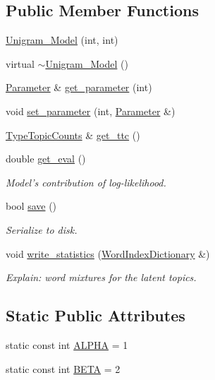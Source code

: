 \subsection*{Public Member Functions}
\begin{DoxyCompactItemize}
\item 
\hyperlink{class_unigram___model_aa86fe0d209d879da85845ac965b81114}{Unigram\_\-Model} (int, int)
\item 
virtual \hyperlink{class_unigram___model_ad586c2960ea07499611ca3c35050d8d3}{$\sim$Unigram\_\-Model} ()
\item 
\hyperlink{struct_parameter}{Parameter} \& \hyperlink{class_unigram___model_a4019fec4ad9201ff501e9649c7d56dac}{get\_\-parameter} (int)
\item 
void \hyperlink{class_unigram___model_a6c75eb8c6c27305b9d37f2425c471c34}{set\_\-parameter} (int, \hyperlink{struct_parameter}{Parameter} \&)
\item 
\hyperlink{class_type_topic_counts}{TypeTopicCounts} \& \hyperlink{class_unigram___model_ad658c21f80aed90d7a06bcc627a23032}{get\_\-ttc} ()
\item 
double \hyperlink{class_unigram___model_a68837b7da897fc7ce834df31d6930281}{get\_\-eval} ()
\begin{DoxyCompactList}\small\item\em Model's contribution of log-\/likelihood. \item\end{DoxyCompactList}\item 
bool \hyperlink{class_unigram___model_a8ca0b95bc57583f70035825f1f950314}{save} ()
\begin{DoxyCompactList}\small\item\em Serialize to disk. \item\end{DoxyCompactList}\item 
void \hyperlink{class_unigram___model_a15ce4009b3434ea11a5045f8f20ce294}{write\_\-statistics} (\hyperlink{class_word_index_dictionary}{WordIndexDictionary} \&)
\begin{DoxyCompactList}\small\item\em Explain: word mixtures for the latent topics. \item\end{DoxyCompactList}\end{DoxyCompactItemize}
\subsection*{Static Public Attributes}
\begin{DoxyCompactItemize}
\item 
static const int \hyperlink{class_unigram___model_aa5cba2e31940356b03895c5ff509ea4e}{ALPHA} = 1
\item 
static const int \hyperlink{class_unigram___model_a863bfe2570e8033eec42004a9b4239f8}{BETA} = 2
\end{DoxyCompactItemize}


